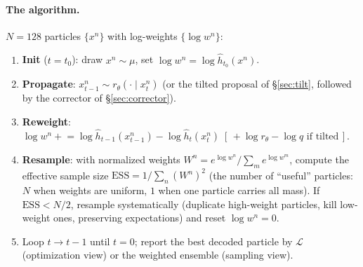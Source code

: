 \documentclass[11pt]{article}
\newcommand{\Ploss}{\mathcal{L}}
\begin{document}
\paragraph{The algorithm.} $N{=}128$ particles $\{x^n\}$ with log-weights
$\{\log w^n\}$:
\begin{enumerate}
\item \textbf{Init} ($t = t_0$): draw $x^n \sim \mu$, set
$\log w^n = \log \hat h_{t_0}(x^n)$.
\item \textbf{Propagate}: $x^n_{t-1} \sim r_\theta(\cdot \mid x^n_t)$
(or the tilted proposal of \S\ref{sec:tilt}, followed by the corrector of
\S\ref{sec:corrector}).
\item \textbf{Reweight}:
$\log w^n \mathrel{+}= \log \hat h_{t-1}(x^n_{t-1}) - \log \hat h_{t}(x^n_{t})
\;[\,+ \log r_\theta - \log q \text{ if tilted}\,]$.
\item \textbf{Resample}: with normalized weights
$W^n = e^{\log w^n} / \sum_m e^{\log w^m}$, compute the effective sample
size $\mathrm{ESS} = 1 / \sum_n (W^n)^2$ (the number of ``useful''
particles: $N$ when weights are uniform, $1$ when one particle carries all
mass). If $\mathrm{ESS} < N/2$, resample systematically (duplicate
high-weight particles, kill low-weight ones, preserving expectations) and
reset $\log w^n = 0$.
\item Loop $t \to t-1$ until $t{=}0$; report the best decoded particle
by $\Ploss$ (optimization view) or the weighted ensemble (sampling view).
\end{enumerate}
\end{document}
